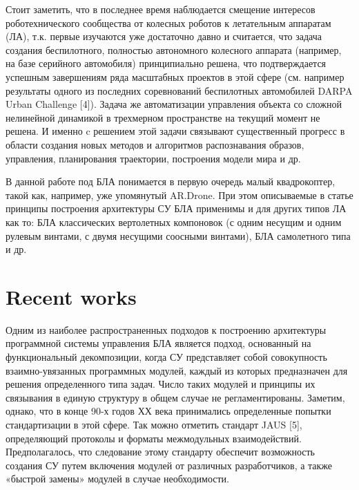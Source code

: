 \documentclass{svjour3}                     %
\begin{document}
Стоит заметить, что в последнее время наблюдается смещение интересов роботехнического сообщества от колесных роботов к летательным аппаратам (ЛА), т.к. первые изучаются уже достаточно давно и считается, что задача создания беспилотного, полностью автономного колесного аппарата (например, на базе серийного автомобиля) принципиально решена, что подтверждается успешным завершениям ряда масштабных проектов в этой сфере (см. например результаты одного из последних соревнований беспилотных автомобилей DARPA Urban Challenge [4]). Задача же автоматизации управления объекта со сложной нелинейной динамикой в трехмерном пространстве на текущий момент не решена. И именно c решением этой задачи связывают существенный прогресс в области создания новых методов и алгоритмов распознавания образов, управления, планирования траектории, построения модели мира и др.

В данной работе под БЛА понимается в первую очередь малый квадрокоптер, такой как, например, уже упомянутый AR.Drone. При этом описываемые в статье принципы построения архитектуры СУ БЛА применимы и для других типов ЛА как то: БЛА классических вертолетных компоновок (с одним несущим и одним рулевым винтами, с двумя несущими соосными винтами), БЛА самолетного типа и др. 

\section{Recent works}
\label{sec:1}

Одним из наиболее распространенных подходов к построению архитектуры программной системы управления БЛА является подход, основанный на функциональный декомпозиции, когда СУ представляет собой совокупность взаимно-увязанных программных модулей, каждый из которых предназначен для решения определенного типа задач. Число таких модулей и принципы их связывания в единую структуру в общем случае не регламентированы. Заметим, однако, что в конце 90-х годов ХХ века принимались определенные попытки стандартизации в этой сфере. Так можно отметить стандарт JAUS [5], определяющий протоколы и форматы межмодульных взаимодействий. Предполагалось, что следование этому стандарту обеспечит возможность создания СУ путем включения модулей от различных разработчиков, а также «быстрой замены» модулей в случае необходимости.
\end{document}
